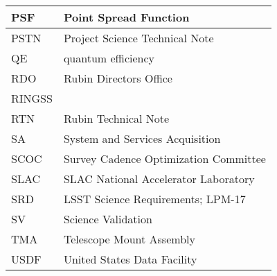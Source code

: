\begin{longtable}{p{}p{}}
PSF & Point Spread Function \\\hline
PSTN & Project Science Technical Note \\\hline
QE & quantum efficiency \\\hline
RDO & Rubin Directors Office \\\hline
RINGSS &  \\\hline
RTN & Rubin Technical Note \\\hline
SA & System and Services Acquisition \\\hline
SCOC & Survey Cadence Optimization Committee \\\hline
SLAC & SLAC National Accelerator Laboratory \\\hline
SRD & LSST Science Requirements; LPM-17 \\\hline
SV & Science Validation \\\hline
TMA & Telescope Mount Assembly \\\hline
USDF & United States Data Facility \\\hline
\end{longtable}

